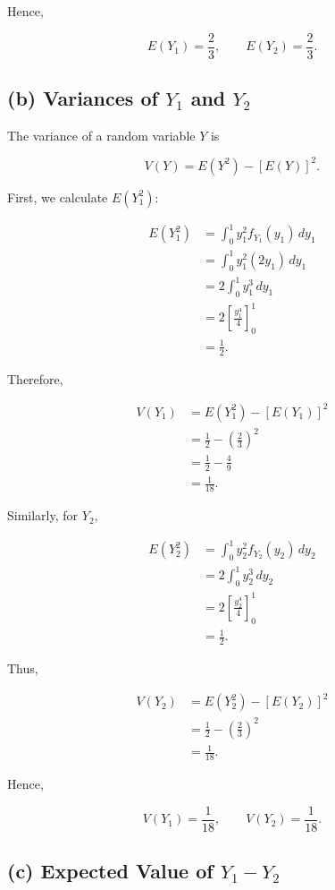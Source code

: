 \documentclass[11pt, a4paper]{article}
\begin{document}
Hence,

\[
E(Y_1)=\frac{2}{3},
\qquad
E(Y_2)=\frac{2}{3}.
\]

\subsection{(b) Variances of $Y_1$ and $Y_2$}

The variance of a random variable $Y$ is

\[
V(Y)=E(Y^2)-[E(Y)]^2.
\]

First, we calculate $E(Y_1^2)$:

\begin{align*}
E(Y_1^2)
&= \int_0^1 y_1^2 f_{Y_1}(y_1)\,dy_1\\
&= \int_0^1 y_1^2(2y_1)\,dy_1\\
&= 2\int_0^1 y_1^3\,dy_1\\
&= 2\left[\frac{y_1^4}{4}\right]_0^1\\
&= \frac{1}{2}.
\end{align*}

Therefore,

\begin{align*}
V(Y_1)
&= E(Y_1^2)-[E(Y_1)]^2\\
&= \frac{1}{2}-\left(\frac{2}{3}\right)^2\\
&= \frac{1}{2}-\frac{4}{9}\\
&= \frac{1}{18}.
\end{align*}

Similarly, for $Y_2$,

\begin{align*}
E(Y_2^2)
&= \int_0^1 y_2^2 f_{Y_2}(y_2)\,dy_2\\
&= 2\int_0^1 y_2^3\,dy_2\\
&= 2\left[\frac{y_2^4}{4}\right]_0^1\\
&= \frac{1}{2}.
\end{align*}

Thus,

\begin{align*}
V(Y_2)
&= E(Y_2^2)-[E(Y_2)]^2\\
&= \frac{1}{2}-\left(\frac{2}{3}\right)^2\\
&= \frac{1}{18}.
\end{align*}

Hence,

\[
V(Y_1)=\frac{1}{18},
\qquad
V(Y_2)=\frac{1}{18}.
\]

\subsection{(c) Expected Value of $Y_1-Y_2$}
\end{document}
